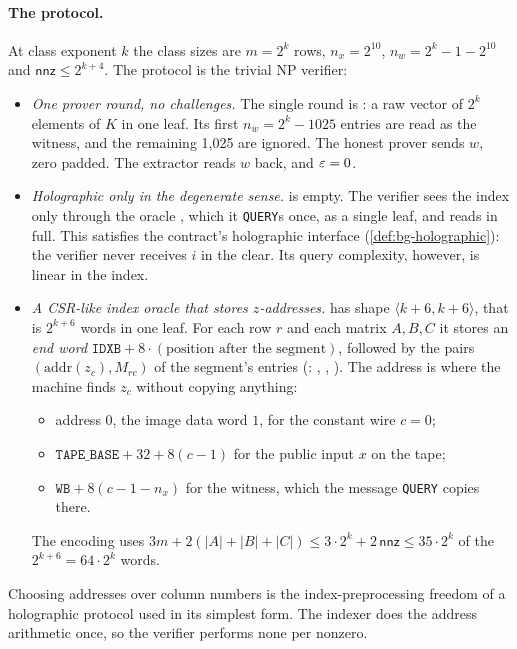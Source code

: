 \paragraph{The protocol.} At class exponent $k$ the class sizes are $m=2^k$ rows, $n_x=2^{10}$,
$n_w=2^k-1-2^{10}$ and $\mathsf{nnz}\le2^{k+4}$. The protocol is the trivial NP verifier:
\begin{itemize}[nosep]
\item \emph{One prover round, no challenges.} The single round is : a raw vector of
  $2^k$ elements of $K$ in one leaf. Its first $n_w=2^k-1025$ entries are read as the witness, and the
  remaining 1{,}025 are ignored. The honest prover sends $w$, zero padded. The extractor reads $w$
  back, and $\varepsilon=0$.
\item \emph{Holographic only in the degenerate sense.}  is empty. The verifier sees the
  index only through the oracle , which it \texttt{QUERY}s once, as a single leaf, and
  reads in full. This satisfies the contract's holographic interface
  (\cref{def:bg-holographic}): the verifier never receives $i$ in the clear. Its query complexity,
  however, is linear in the index.
\item \emph{A CSR-like index oracle that stores $z$-addresses.}  has shape
  $\langle k{+}6,k{+}6\rangle$, that is $2^{k+6}$ words in one leaf. For each row $r$ and each matrix
  $A,B,C$ it stores an \emph{end word} $\mathtt{IDXB}+8\cdot(\text{position after the segment})$,
  followed by the pairs $(\mathrm{addr}(z_c),M_{rc})$ of the segment's entries
  (: , , ). The address is where the machine
  finds $z_c$ without copying anything:
  \begin{itemize}[nosep]
  \item address $0$, the image data word $1$, for the constant wire $c=0$;
  \item $\mathtt{TAPE\_BASE}+32+8(c-1)$ for the public input $x$ on the tape;
  \item $\mathtt{WB}+8(c-1-n_x)$ for the witness, which the message \texttt{QUERY} copies there.
  \end{itemize}
  The encoding uses $3m+2(|A|+|B|+|C|)\le3\cdot2^k+2\,\mathsf{nnz}\le35\cdot2^k$ of the
  $2^{k+6}=64\cdot2^k$ words.
\end{itemize}
Choosing addresses over column numbers is the index-preprocessing freedom of a holographic protocol
used in its simplest form. The indexer does the address arithmetic once, so the verifier performs
none per nonzero.

